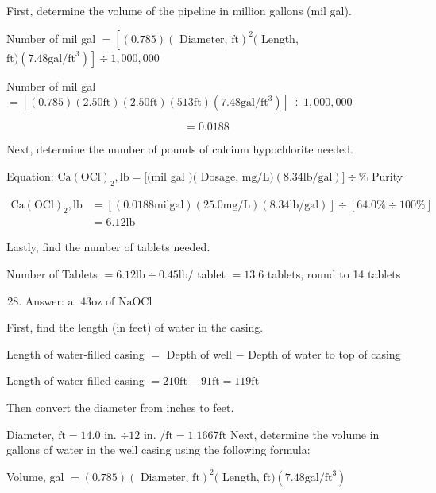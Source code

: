 \documentclass[10pt]{article}
\begin{document}
First, determine the volume of the pipeline in million gallons (mil gal).

Number of mil gal $=\left[(0.785)(\text { Diameter, } \mathrm{ft})^{2}(\right.$ Length, $\left.\mathrm{ft})\left(7.48 \mathrm{gal} / \mathrm{ft}^{3}\right)\right] \div 1,000,000$

Number of mil gal $=\left[(0.785)(2.50 \mathrm{ft})(2.50 \mathrm{ft})(513 \mathrm{ft})\left(7.48 \mathrm{gal} / \mathrm{ft}^{3}\right)\right] \div 1,000,000$

$$
=0.0188
$$

Next, determine the number of pounds of calcium hypochlorite needed.

Equation: $\mathrm{Ca}(\mathrm{OCl})_{2}, \mathrm{lb}=[(\mathrm{mil}$ gal $)($ Dosage, $\mathrm{mg} / \mathrm{L})(8.34 \mathrm{lb} / \mathrm{gal})] \div \%$ Purity

$$
\begin{aligned}
\mathrm{Ca}(\mathrm{OCl})_{2}, \mathrm{lb} &=[(0.0188 \mathrm{mil} \mathrm{gal})(25.0 \mathrm{mg} / \mathrm{L})(8.34 \mathrm{lb} / \mathrm{gal})] \div[64.0 \% \div 100 \%] \\
&=6.12 \mathrm{lb}
\end{aligned}
$$

Lastly, find the number of tablets needed.

Number of Tablets $=6.12 \mathrm{lb} \div 0.45 \mathrm{lb} /$ tablet $=13.6$ tablets, round to 14 tablets

\begin{enumerate}
  \setcounter{enumi}{27}
  \item Answer: a. $43 \mathrm{oz}$ of $\mathrm{NaOCl}$
\end{enumerate}

First, find the length (in feet) of water in the casing.

Length of water-filled casing $=$ Depth of well $-$ Depth of water to top of casing

Length of water-filled casing $=210 \mathrm{ft}-91 \mathrm{ft}=119 \mathrm{ft}$

Then convert the diameter from inches to feet.

Diameter, $\mathrm{ft}=14.0$ in. $\div 12$ in. $/ \mathrm{ft}=1.1667 \mathrm{ft}$ Next, determine the volume in gallons of water in the well casing using the following formula:

Volume, gal $=(0.785)(\text { Diameter, } \mathrm{ft})^{2}($ Length, $\mathrm{ft})\left(7.48 \mathrm{gal} / \mathrm{ft}^{3}\right)$
\end{document}
